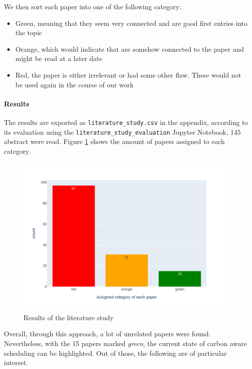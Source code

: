 We then sort each paper into one of the following category:

\begin{itemize}
    \item Green, meaning that they seem very connected and are good first entries into the topic
    \item Orange, which would indicate that are somehow connected to the paper and might be read at a later date
    \item Red, the paper is either irrelevant or had some other flaw. These would not be used again in the course of our work
\end{itemize}

\paragraph{Results}

The results are exported as \verb|literature_study.csv| in the appendix, according to its evaluation using the \verb|literature_study_evaluation| Jupyter Notebook, 145 abstract were read. 
Figure \ref{fig:literature_study} shows the amount of papers assigned to each category.

\begin{figure}
    \includegraphics[width=\linewidth]{literaturrecherche/literature_study.pdf}
    \caption[short]{Results of the literature study}
    \label{fig:literature_study}
\end{figure}

Overall, through this approach, a lot of unrelated papers were found.
Nevertheless, with the 15 papers marked \emph{green}, the current state of carbon aware scheduling can be highlighted.
Out of those, the following are of particular interest.

